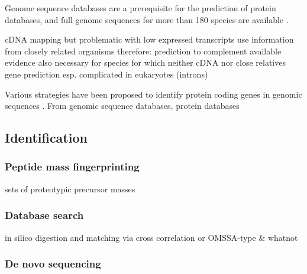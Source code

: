 
Genome sequence databases are a prerequisite for the prediction of protein 
databases, and full genome sequences for more than 180 species are available
\citep{Yates2009}.

\begin{todo}
cDNA mapping but problematic with low expressed transcripts
use information from closely related organisms
therefore: prediction to complement available evidence
also necessary for species for which neither cDNA nor close relatives
gene prediction esp. complicated in eukaryotes (introns)
\end{todo}

Various strategies have been proposed to identify protein coding genes in
genomic sequences \citep{Reese2000, Burge1997, Parra2000}.
From genomic sequence databases, protein databases 



\subsection{Identification}

\subsubsection{Peptide mass fingerprinting}

\begin{todo}
sets of proteotypic precursor masses
\end{todo}

\subsubsection{Database search}

\begin{todo}
in silico digestion and matching via cross correlation or OMSSA-type & whatnot
\end{todo}

\subsubsection{De novo sequencing}

